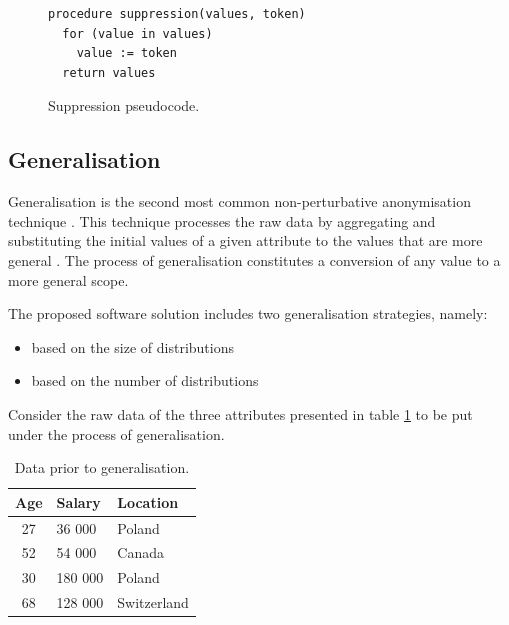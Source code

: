 \documentclass[a4paper,twoside,12pt]{book}
\begin{document}
\begin{figure}[h]
\begin{verbatim}
procedure suppression(values, token)
  for (value in values)
    value := token
  return values
\end{verbatim}
\caption{Suppression pseudocode.}
\label{fig:code:suppression}
\end{figure}


\subsection{Generalisation}

Generalisation is the second most common non-perturbative anonymisation technique \cite{bib:privacy_unesco_bigdata}. This technique processes the raw data by aggregating and substituting the initial values of a given attribute to the values that are more general \cite{bib:privacy_unesco_rule_based}. The process of generalisation constitutes a conversion of any value to a more general scope.

The proposed software solution includes two generalisation strategies, namely:
\begin{itemize}
\item based on the size of distributions
\item based on the number of distributions
\end{itemize}

Consider the raw data of the three attributes presented in table \ref{id:tab:generalisation_raw} to be put under the process of generalisation.

\begin{table}[h]
\centering
\caption{Data prior to generalisation.}
\label{id:tab:generalisation_raw}
\begin{tabular}{@{}cll@{}}
\toprule
\multicolumn{1}{l}{Age} & Salary  & Location    \\ \midrule
27                      & 36 000  & Poland      \\
52                      & 54 000  & Canada      \\
30                      & 180 000 & Poland      \\
68                      & 128 000 & Switzerland \\ \bottomrule
\end{tabular}
\end{table}
\end{document}
